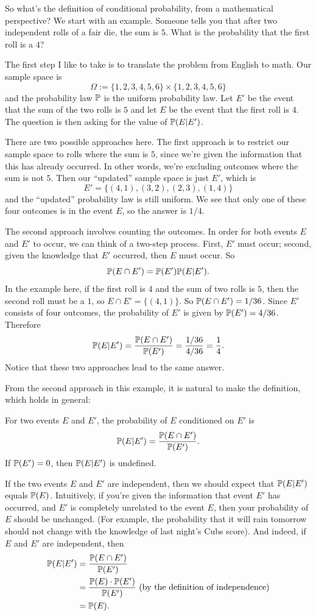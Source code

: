 \documentclass{ximera}
\begin{document}
So what's the definition of conditional probability, from a mathematical perspective? We start with an example. Someone tells you that after two independent rolls of a fair die, the sum is $5$. What is the probability that the first roll is a $4$?

The first step I like to take is to translate the problem from English to math. Our sample space is
$$
\Omega := \{1,2,3,4,5,6\} \times \{1,2,3,4,5,6\}
$$
and the probability law $\mathbb{P}$ is the uniform probability law. Let $E'$ be the event that the sum of the two rolls is $5$ and let $E$ be the event that the first roll is $4$. The question is then asking for the value of $\mathbb{P}(E \vert E')$.

There are two possible approaches here. The first approach is to restrict our sample space to rolls where the sum is $5$, since we're given the information that this has already occurred. In other words, we're excluding outcomes where the sum is not $5$. Then our ``updated'' sample space is just $E'$, which is
$$
E' = \{ (4,1),(3,2),(2,3),(1,4)\}
$$
and the ``updated'' probability law is still uniform. We see that only one of these four outcomes is in the event $E$, so the answer is $1/4$.

The second approach involves counting the outcomes. In order for both events $E$ and $E'$ to occur, we can think of a two-step process. First, $E'$ must occur; second, given the knowledge that $E'$ occurred, then $E$ must occur. So
$$
\mathbb{P}(E \cap E') = \mathbb{P}(E') \mathbb{P}(E \vert E').
$$
In the example here, if the first roll is $4$ and the sum of two rolls is $5$, then the second roll must be a $1$, so $E\cap E' = \{(4,1)\}$. So $\mathbb{P}(E\cap E')=1/36$. Since $E'$ consists of four outcomes, the probability of $E'$ is given by $\mathbb{P}(E')=4/36$. Therefore
$$
\mathbb{P}(E \vert E') = \frac{\mathbb{P}(E \cap E') }{\mathbb{P}(E') } = \frac{1/36}{4/36} = \frac{1}{4}.
$$
Notice that these two approaches lead to the same answer. 

From the second approach in this example, it is natural to make the definition, which holds in general:

\begin{definition}
For two events $E$ and $E'$, the probability of $E$ conditioned on $E'$ is
$$
\mathbb{P}(E \vert E') = \frac{\mathbb{P}(E \cap E') }{\mathbb{P}(E') } . 
$$
If $\mathbb{P}(E')=0$, then $\mathbb{P}(E \vert E')$ is undefined.
\end{definition}

If the two events $E$ and $E'$ are independent, then we should expect that $\mathbb{P}(E \vert E')$ equals $\mathbb{P}(E)$. Intuitively, if you're given the information that event $E'$ has occurred, and $E'$ is completely unrelated to the event $E$, then your probability of $E$ should be unchanged. (For example, the probability that it will rain tomorrow should not change with the knowledge of last night's Cubs score). And indeed, if $E$ and $E'$ are independent, then
\begin{align*}
\mathbb{P}(E \vert E') &= \frac{\mathbb{P}(E \cap E') }{\mathbb{P}(E') } \\
&= \frac{\mathbb{P}(E) \cdot \mathbb{P}(E')}{\mathbb{P}(E')} \text{   (by the definition of independence)} \\
&= \mathbb{P}(E).
\end{align*}
\end{document}
